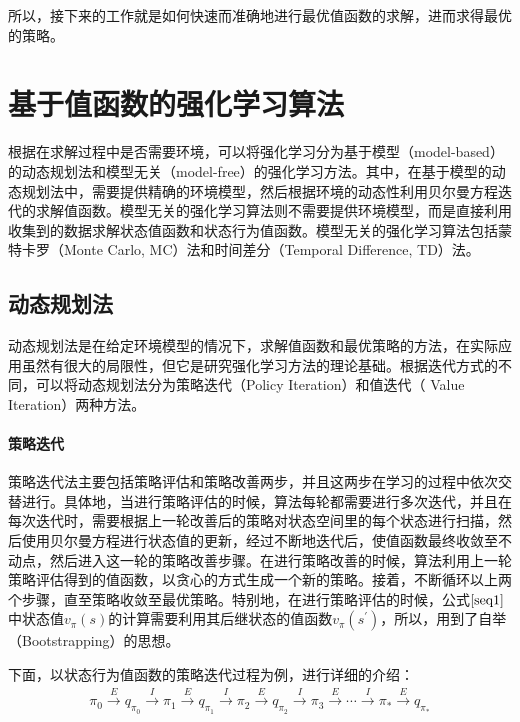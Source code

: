 所以，接下来的工作就是如何快速而准确地进行最优值函数的求解，进而求得最优的策略。

\section{基于值函数的强化学习算法}

根据在求解过程中是否需要环境，可以将强化学习分为基于模型（model-based）的动态规划法和模型无关（model-free）的强化学习方法。其中，在基于模型的动态规划法中，需要提供精确的环境模型，然后根据环境的动态性利用贝尔曼方程迭代的求解值函数。模型无关的强化学习算法则不需要提供环境模型，而是直接利用收集到的数据求解状态值函数和状态行为值函数。模型无关的强化学习算法包括蒙特卡罗（Monte Carlo, MC）法和时间差分（Temporal Difference, TD）法\citep{2016面向强化学习的模型学习算法研究}。

\subsection{动态规划法}
动态规划法是在给定环境模型的情况下，求解值函数和最优策略的方法，在实际应用虽然有很大的局限性，但它是研究强化学习方法的理论基础。根据迭代方式的不同，可以将动态规划法分为策略迭代（Policy Iteration）和值迭代（ Value Iteration）两种方法。
\paragraph{策略迭代}

策略迭代法主要包括策略评估和策略改善两步，并且这两步在学习的过程中依次交替进行。具体地，当进行策略评估的时候，算法每轮都需要进行多次迭代，并且在每次迭代时，需要根据上一轮改善后的策略对状态空间里的每个状态进行扫描，然后使用贝尔曼方程进行状态值的更新，经过不断地迭代后，使值函数最终收敛至不动点，然后进入这一轮的策略改善步骤。在进行策略改善的时候，算法利用上一轮策略评估得到的值函数，以贪心的方式生成一个新的策略。接着，不断循环以上两个步骤，直至策略收敛至最优策略。特别地，在进行策略评估的时候，公式$\eqref{seq1}$中状态值$v_{\pi}(s)$的计算需要利用其后继状态的值函数$v_{\pi}(s^{'})$，所以，用到了自举（Bootstrapping）的思想。

下面，以状态行为值函数的策略迭代过程为例，进行详细的介绍：
\begin{displaymath}
\begin{aligned}
\pi_{0}\xrightarrow{E}q_{\pi_0}\xrightarrow{I}\pi_{1}\xrightarrow{E}q_{\pi_1}\xrightarrow{I}\pi_{2}\xrightarrow{E}q_{\pi_2}\xrightarrow{I}\pi_{3}\xrightarrow{E} \cdots \xrightarrow{I}\pi_{*}\xrightarrow{E}q_{\pi_{*}}
\end{aligned}
\end{displaymath}

